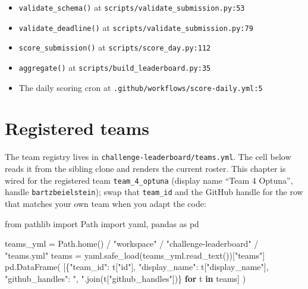 \documentclass[
  english,
  letterpaper,
]{scrbook}
\newenvironment{Shaded}{\begin{snugshade}}{\end{snugshade}}
\newcommand{\ControlFlowTok}[1]{\textcolor[rgb]{0.00,0.23,0.31}{\textbf{#1}}}
\newcommand{\ImportTok}[1]{\textcolor[rgb]{0.00,0.46,0.62}{#1}}
\newcommand{\KeywordTok}[1]{\textcolor[rgb]{0.00,0.23,0.31}{\textbf{#1}}}
\newcommand{\NormalTok}[1]{\textcolor[rgb]{0.00,0.23,0.31}{#1}}
\newcommand{\OperatorTok}[1]{\textcolor[rgb]{0.37,0.37,0.37}{#1}}
\newcommand{\StringTok}[1]{\textcolor[rgb]{0.13,0.47,0.30}{#1}}
\providecommand{\tightlist}{%
  \setlength{\itemsep}{0pt}\setlength{\parskip}{0pt}}
\begin{document}
\begin{itemize}
\tightlist
\item
  \texttt{validate\_schema()} at
  \texttt{scripts/validate\_submission.py:53}
\item
  \texttt{validate\_deadline()} at
  \texttt{scripts/validate\_submission.py:79}
\item
  \texttt{score\_submission()} at \texttt{scripts/score\_day.py:112}
\item
  \texttt{aggregate()} at \texttt{scripts/build\_leaderboard.py:35}
\item
  The daily scoring cron at \texttt{.github/workflows/score-daily.yml:5}
\end{itemize}

\section{Registered teams}\label{sec-live-teams}

The team registry lives in \texttt{challenge-leaderboard/teams.yml}. The
cell below reads it from the sibling clone and renders the current
roster. This chapter is wired for the registered team
\texttt{team\_4\_optuna} (display name ``Team 4 Optuna'', handle
\texttt{bartzbeielstein}); swap that \texttt{team\_id} and the GitHub
handle for the row that matches your own team when you adapt the code:

\begin{Shaded}
\begin{Highlighting}[]
\ImportTok{from}\NormalTok{ pathlib }\ImportTok{import}\NormalTok{ Path}
\ImportTok{import}\NormalTok{ yaml, pandas }\ImportTok{as}\NormalTok{ pd}

\NormalTok{teams\_yml }\OperatorTok{=}\NormalTok{ Path.home() }\OperatorTok{/} \StringTok{"workspace"} \OperatorTok{/} \StringTok{"challenge{-}leaderboard"} \OperatorTok{/} \StringTok{"teams.yml"}
\NormalTok{teams }\OperatorTok{=}\NormalTok{ yaml.safe\_load(teams\_yml.read\_text())[}\StringTok{"teams"}\NormalTok{]}
\NormalTok{pd.DataFrame(}
\NormalTok{    [\{}\StringTok{"team\_id"}\NormalTok{: t[}\StringTok{"id"}\NormalTok{],}
      \StringTok{"display\_name"}\NormalTok{: t[}\StringTok{"display\_name"}\NormalTok{],}
      \StringTok{"github\_handles"}\NormalTok{: }\StringTok{", "}\NormalTok{.join(t[}\StringTok{"github\_handles"}\NormalTok{])\}}
     \ControlFlowTok{for}\NormalTok{ t }\KeywordTok{in}\NormalTok{ teams]}
\NormalTok{)}
\end{Highlighting}
\end{Shaded}
\end{document}
